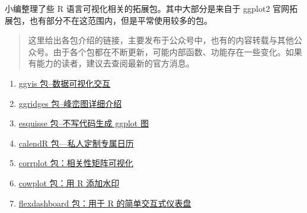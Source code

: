 \documentclass[
]{book}
\begin{document}
小编整理了些 R 语言可视化相关的拓展包。其中大部分是来自于 ggplot2 官网拓展包，也有部分不在这范围内，但是平常使用较多的包。

\begin{quote}
这里给出各包介绍的链接，主要发布于公众号中，也有的内容转载与其他公众号。由于各个包都在不断更新，可能内部函数、功能存在一些变化。如果有能力的读者，建议去查阅最新的官方消息。
\end{quote}

\begin{enumerate}
\def\labelenumi{\arabic{enumi}.}
\item
  \href{http://mp.weixin.qq.com/s?__biz=MzI1NjUwMjQxMQ==\&mid=2247488405\&idx=1\&sn=271fc88b523e738a6a1d92504dbce330\&chksm=ea24ec71dd5365671bb66cbb50afdb0b00762b7581b9d3e5060a4b59021485364093f1c8b963\&scene=21\#wechat_redirect}{ggvis 包--数据可视化交互}
\item
  \href{http://mp.weixin.qq.com/s?__biz=MzI1NjUwMjQxMQ==\&mid=2247488248\&idx=1\&sn=6b71d7adba5ea796fdfe8f49fe232d94\&chksm=ea24ed1cdd53640a1e30271584458097fce82a732f9d63ce2084dc63fbae6fb028fd7f813bb7\&scene=21\#wechat_redirect}{ggridges 包--峰峦图详细介绍}
\item
  \href{http://mp.weixin.qq.com/s?__biz=MzI1NjUwMjQxMQ==\&mid=2247488200\&idx=1\&sn=3a058480b104165118975b2d908dff72\&chksm=ea24ed2cdd53643a9deb58069cd8d0e9933fc165994a2bb7a6f7d4651c7796b839fc781ec86d\&scene=21\#wechat_redirect}{esquisse 包--不写代码生成 ggplot 图}
\item
  \href{http://mp.weixin.qq.com/s?__biz=MzI1NjUwMjQxMQ==\&mid=2247487814\&idx=1\&sn=aa58149b66ce8b6d1c6210ded418c71a\&chksm=ea24eea2dd5367b4a24a670b9e78d377f1506399be8dd0d0a35230407e3dc131f6b07ab3d9ca\&scene=21\#wechat_redirect}{calendR 包---私人定制专属日历}
\item
  \href{http://mp.weixin.qq.com/s?__biz=MzI1NjUwMjQxMQ==\&mid=2247487625\&idx=1\&sn=3102c4afb0cf97904d810579af386eb6\&chksm=ea24ef6ddd53667b887d11e7013589f796c8ff4f9e1e9b6e8df817ea7b223baadbc19dfbaaa5\&scene=21\#wechat_redirect}{corrplot 包：相关性矩阵可视化}
\item
  \href{http://mp.weixin.qq.com/s?__biz=MzI1NjUwMjQxMQ==\&mid=2247486838\&idx=2\&sn=21ee1c8b683e7d27373f3e1f40901428\&chksm=ea24f292dd537b843db330a88161ce6f89227418f64515164615c3f63721df6464b6d91a2b1a\&scene=21\#wechat_redirect}{cowplot 包：用 R 添加水印}
\item
  \href{http://mp.weixin.qq.com/s?__biz=MzI1NjUwMjQxMQ==\&mid=2247486237\&idx=1\&sn=571544510c7e3e48a280dd4d677656e5\&chksm=ea24f4f9dd537defa493c419973f75943159316765ac61093a195b83fde314dd7fffe61349cd\&scene=21\#wechat_redirect}{flexdashboard 包：用于 R 的简单交互式仪表盘}

\end{enumerate}
\end{document}
